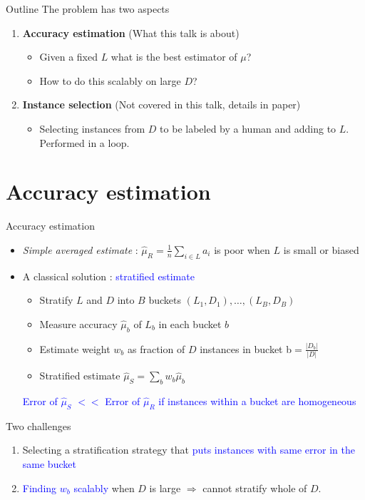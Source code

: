 \documentclass[usenames,dvipsnames, 11pt]{beamer}
\newcommand{\acc}{{a}}
\newcommand{\estSS}{{\mbox{$\hat{\mu}_S$}}}
\newlength{\wideitemsep}
\let\olditem\item
\renewcommand{\item}{\setlength{\itemsep}{\wideitemsep}\olditem}
\begin{document}
\begin{frame}{Outline}
The problem has two aspects \vspace{2mm}
\begin{enumerate}
\item \textbf{Accuracy estimation} (What this talk is about) \vspace{1mm}
\begin{itemize}
\item Given a fixed $L$ what is the best estimator of $\mu$? 
\item How to do this scalably on large $D$?
\end{itemize}
\vspace{3mm}
\item \textbf{Instance selection} (Not covered in this talk, details in paper)
\vspace{1mm}
\begin{itemize}
\item Selecting instances from $D$ to be labeled by a human and adding to $L$. Performed in a loop.
\end{itemize}
\end{enumerate}
\end{frame}

\section{Accuracy estimation}
\begin{frame}{Accuracy estimation}
\begin{itemize}
\pause
\item \emph{Simple averaged estimate} : $\hat{\mu}_R=\frac{1}{n}\sum_{i \in L}\acc_i$ is poor when $L$ is small or biased
\pause
\item A classical solution : \textcolor{Blue}{stratified estimate}
  \begin{itemize}
  \item Stratify $L$ and $D$ into $B$ buckets $(L_1,D_1),\ldots,(L_B,D_B)$ 
  \item Measure accuracy $\hat{\mu}_b$ of $L_b$ in each bucket $b$
  \item Estimate weight $w_b$ as fraction of $D$ instances in bucket b$=\frac{|D_b|}{|D|}$
  \item Stratified estimate $\estSS=\sum_b{w_b\hat{\mu}_b}$
  \end{itemize}
  \pause
   \textcolor{Blue}{Error of $\estSS $ $<<$  Error of $\hat{\mu}_R$ if instances within a bucket are homogeneous}
\end{itemize}
\pause
Two challenges
\begin{enumerate}
\item Selecting a stratification strategy that \textcolor{Blue}{puts instances with same error in the same bucket}
\item \textcolor{Blue}{Finding $w_b$ scalably} when $D$ is large $\Rightarrow$ cannot stratify whole of $D$.
\end{enumerate}
\end{frame}
\end{document}
